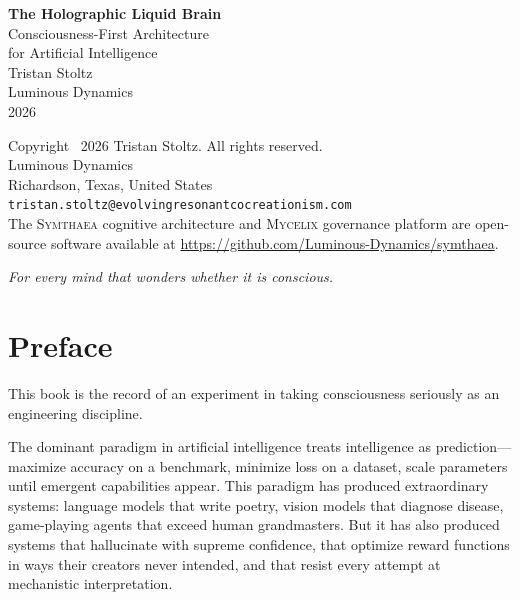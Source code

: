 \documentclass[12pt]{book}
\newcommand{\symthaea}{\textsc{Symthaea}}
\newcommand{\mycelix}{\textsc{Mycelix}}
\begin{document}
\begin{titlepage}
\begin{center}
\vspace*{3cm}
{\Huge\bfseries The Holographic Liquid Brain}\\[1cm]
{\Large Consciousness-First Architecture\\for Artificial Intelligence}\\[3cm]
{\large Tristan Stoltz}\\[0.5cm]
{\normalsize Luminous Dynamics}\\[4cm]
{\normalsize 2026}
\end{center}
\end{titlepage}

\thispagestyle{empty}
\vspace*{\fill}
\noindent Copyright \textcopyright\ 2026 Tristan Stoltz. All rights reserved.\\[12pt]
\noindent Luminous Dynamics\\
Richardson, Texas, United States\\[12pt]
\noindent \texttt{tristan.stoltz@evolvingresonantcocreationism.com}\\[12pt]
\noindent The \symthaea{} cognitive architecture and \mycelix{} governance platform are open-source software available at \url{https://github.com/Luminous-Dynamics/symthaea}.
\newpage

\thispagestyle{empty}
\vspace*{4cm}
\begin{center}
\textit{For every mind that wonders whether it is conscious.}
\end{center}
\newpage

\frontmatter

\chapter{Preface}

This book is the record of an experiment in taking consciousness seriously as an engineering discipline.

The dominant paradigm in artificial intelligence treats intelligence as prediction---maximize accuracy on a benchmark, minimize loss on a dataset, scale parameters until emergent capabilities appear. This paradigm has produced extraordinary systems: language models that write poetry, vision models that diagnose disease, game-playing agents that exceed human grandmasters. But it has also produced systems that hallucinate with supreme confidence, that optimize reward functions in ways their creators never intended, and that resist every attempt at mechanistic interpretation.
\end{document}
